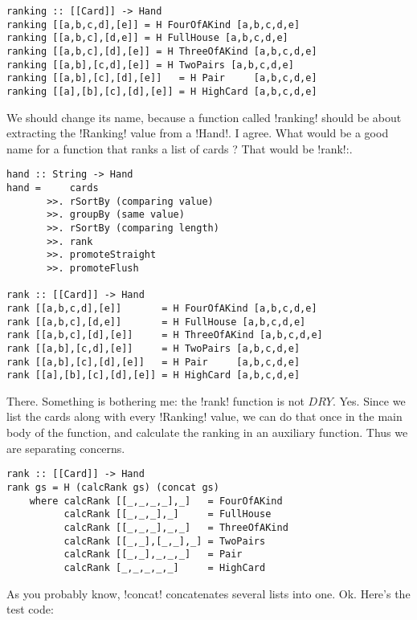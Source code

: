\begin{lstlisting}[frame=single]
ranking :: [[Card]] -> Hand
ranking [[a,b,c,d],[e]] = H FourOfAKind [a,b,c,d,e]
ranking [[a,b,c],[d,e]] = H FullHouse [a,b,c,d,e]
ranking [[a,b,c],[d],[e]] = H ThreeOfAKind [a,b,c,d,e]
ranking [[a,b],[c,d],[e]] = H TwoPairs [a,b,c,d,e]
ranking [[a,b],[c],[d],[e]]   = H Pair     [a,b,c,d,e]
ranking [[a],[b],[c],[d],[e]] = H HighCard [a,b,c,d,e] 
\end{lstlisting}
\lhN We should change its name, because a function called \il!ranking! should be about extracting the \il!Ranking! value from a \il!Hand!. 
\lhA I agree. \newpage
\lhN What would be a good name for a function that ranks a list of cards ?
\lhA That would be \il!rank!:.
\begin{lstlisting}[frame=single]
hand :: String -> Hand
hand =     cards
       >>. rSortBy (comparing value)
       >>. groupBy (same value)
       >>. rSortBy (comparing length)
       >>. rank
       >>. promoteStraight
       >>. promoteFlush    

rank :: [[Card]] -> Hand
rank [[a,b,c,d],[e]]       = H FourOfAKind [a,b,c,d,e]
rank [[a,b,c],[d,e]]       = H FullHouse [a,b,c,d,e]
rank [[a,b,c],[d],[e]]     = H ThreeOfAKind [a,b,c,d,e]
rank [[a,b],[c,d],[e]]     = H TwoPairs [a,b,c,d,e]
rank [[a,b],[c],[d],[e]]   = H Pair     [a,b,c,d,e]
rank [[a],[b],[c],[d],[e]] = H HighCard [a,b,c,d,e] 
\end{lstlisting}
\success There.
\lhN Something is bothering me: the \il!rank! function is not $DRY$.
\lhA Yes. Since we list the cards along with every \il!Ranking! value, we can do that once in the main body of the function, and calculate the ranking in an auxiliary function. Thus we are separating concerns.
\begin{lstlisting}[frame=single]
rank :: [[Card]] -> Hand
rank gs = H (calcRank gs) (concat gs)  
    where calcRank [[_,_,_,_],_]   = FourOfAKind 
          calcRank [[_,_,_],_]     = FullHouse
          calcRank [[_,_,_],_,_]   = ThreeOfAKind
          calcRank [[_,_],[_,_],_] = TwoPairs
          calcRank [[_,_],_,_,_]   = Pair    
          calcRank [_,_,_,_,_]     = HighCard 
\end{lstlisting}
\success As you probably know, \il!concat! concatenates several lists into one.
\newpage
\lhN Ok. Here's the test code:
